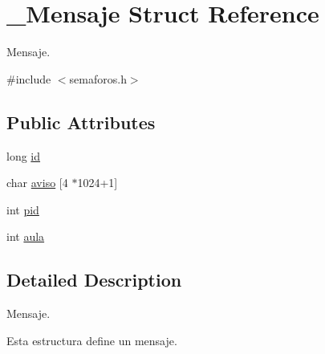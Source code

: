 \hypertarget{struct__Mensaje}{\section{\+\_\+\+Mensaje Struct Reference}
\label{struct__Mensaje}
}


Mensaje.  




{\ttfamily \#include $<$semaforos.\+h$>$}

\subsection*{Public Attributes}
\begin{DoxyCompactItemize}
\item 
long \hyperlink{struct__Mensaje_a216a370cde3eae04df6a81fea5bef338}{id}
\item 
char \hyperlink{struct__Mensaje_a89a493b8d3c3e803d637fbdcfbd1bdab}{aviso} \mbox{[}4 $\ast$1024+1\mbox{]}
\item 
int \hyperlink{struct__Mensaje_a4980e5d47c0feeda94157d1fdbac9fe6}{pid}
\item 
int \hyperlink{struct__Mensaje_a47abc67c07fe0d5eaf709a4a9ad59129}{aula}
\end{DoxyCompactItemize}


\subsection{Detailed Description}
Mensaje. 

Esta estructura define un mensaje. 

